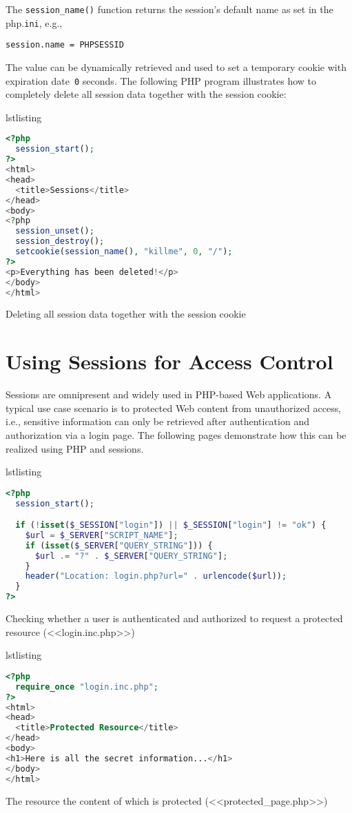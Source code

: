 \documentclass[a4paper, justified, notoc]{tufte-handout} %
\makeatletter
\newenvironment{listing}[1][htbp]
  {\ifvmode\else\unskip\fi\begin{@tufte@float}[#1]{lstlisting}{}}
  {\end{@tufte@float} } %
\makeatother
\begin{document}
The \texttt{session\_name()} function returns the session's default name as set in the php.\texttt{ini}, e.g., 
\begin{Verbatim}
session.name = PHPSESSID
\end{Verbatim}
The value can be dynamically retrieved and used to set a temporary cookie with expiration date~\texttt{0} seconds.
The following PHP program illustrates how to completely delete all session data together with the session cookie:
\begin{listing}
\begin{lstlisting}[language=PHP]
<?php
  session_start();
?>
<html>
<head>
  <title>Sessions</title>
</head>
<body>
<?php
  session_unset();
  session_destroy();
  setcookie(session_name(), "killme", 0, "/");
?>
<p>Everything has been deleted!</p>
</body>
</html>
\end{lstlisting}
	\caption{Deleting all session data together with the session cookie}
	\label{delete_all_session_data}
\end{listing}

\section{Using Sessions for Access Control} %
\label{sec:using_sessions_for_access_control}
Sessions are omnipresent and widely used in PHP-based Web applications.
A typical use case scenario is to protected Web content from unauthorized access, i.e., sensitive information can only be retrieved after authentication and authorization via a login page.
The following pages demonstrate how this can be realized using PHP and sessions.

\begin{listing}
\begin{lstlisting}[language=PHP]
<?php
  session_start();

  if (!isset($_SESSION["login"]) || $_SESSION["login"] != "ok") {
    $url = $_SERVER["SCRIPT_NAME"];
    if (isset($_SERVER["QUERY_STRING"])) {
      $url .= "?" . $_SERVER["QUERY_STRING"];
    }
    header("Location: login.php?url=" . urlencode($url));
  }
?>
\end{lstlisting}
	\caption{Checking whether a user is authenticated and authorized to request a protected resource (<<login.inc.php>>)}
	\label{login_inc}
\end{listing}


\begin{listing}
\begin{lstlisting}[language=PHP]
<?php
  require_once "login.inc.php";
?>
<html>
<head>
  <title>Protected Resource</title>
</head>
<body>
<h1>Here is all the secret information...</h1>
</body>
</html>
\end{lstlisting}
	\caption{The resource the content of which is protected (<<protected\_page.php>>)}
	\label{protected_page}
\end{listing}
\end{document}
